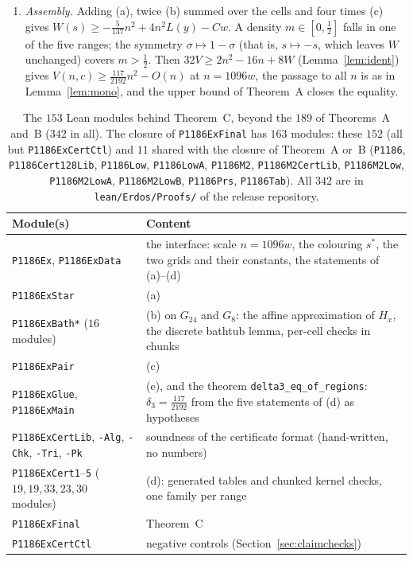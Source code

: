 \documentclass[11pt]{amsart}
\theoremstyle{remark}
\newcommand{\mono}{V}
\newcommand{\lean}[1]{\texttt{#1}}
\begin{document}
\begin{enumerate}
\item[(e)] \emph{Assembly.} Adding (a), twice (b) summed over the cells and four times (c) gives $W(s)\ge-\frac5{137}n^2+4n^2L(y)-Cw$. A density $m\in[0,\frac12]$ falls in one of the five ranges; the symmetry $\sigma\mapsto1-\sigma$ (that is, $s\mapsto-s$, which leaves $W$ unchanged) covers $m>\frac12$. Then $32\mono\ge2n^2-16n+8W$ (Lemma~\ref{lem:ident}) gives $\mono(n,c)\ge\frac{117}{2192}n^2-O(n)$ at $n=1096w$, the passage to all $n$ is as in Lemma~\ref{lem:mono}, and the upper bound of Theorem~A closes the equality.
\end{enumerate}

\begin{table}[h]
\centering\small
\begin{tabular}{p{4.6cm}p{8.2cm}}
\toprule
Module(s) & Content\\
\midrule
\texttt{P1186Ex}, \texttt{P1186ExData} & the interface: scale $n=1096w$, the colouring $s^*$, the two grids and their constants, the statements of (a)--(d)\\
\texttt{P1186ExStar} & (a)\\
\texttt{P1186ExBath*} ($16$ modules) & (b) on $G_{24}$ and $G_8$: the affine approximation of $H_x$, the discrete bathtub lemma, per-cell checks in chunks\\
\texttt{P1186ExPair} & (c)\\
\texttt{P1186ExGlue}, \texttt{P1186ExMain} & (e), and the theorem \lean{delta3\_eq\_of\_regions}: $\delta_3=\frac{117}{2192}$ from the five statements of (d) as hypotheses\\
\texttt{P1186ExCertLib}, \texttt{-Alg}, \texttt{-Chk}, \texttt{-Tri}, \texttt{-Pk} & soundness of the certificate format (hand-written, no numbers)\\
\texttt{P1186ExCert1}--\texttt{5} ($19,19,33,23,30$ modules) & (d): generated tables and chunked kernel checks, one family per range\\
\texttt{P1186ExFinal} & Theorem~C\\
\texttt{P1186ExCertCtl} & negative controls (Section~\ref{sec:claimchecks})\\
\bottomrule
\end{tabular}
\caption{The $153$ Lean modules behind Theorem~C, beyond the $189$ of Theorems~A and~B ($342$ in all). The closure of \texttt{P1186ExFinal} has $163$ modules: these $152$ (all but \texttt{P1186ExCertCtl}) and $11$ shared with the closure of Theorem~A or~B (\texttt{P1186}, \texttt{P1186Cert128Lib}, \texttt{P1186Low}, \texttt{P1186LowA}, \texttt{P1186M2}, \texttt{P1186M2CertLib}, \texttt{P1186M2Low}, \texttt{P1186M2LowA}, \texttt{P1186M2LowB}, \texttt{P1186Prs}, \texttt{P1186Tab}). All $342$ are in \texttt{lean/Erdos/Proofs/} of the release repository.}\label{tab:claimmodules}
\end{table}
\end{document}
